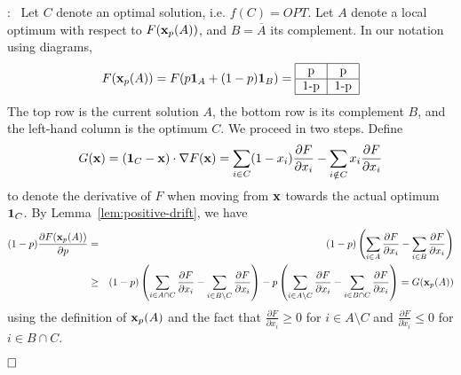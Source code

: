 \documentclass{article}[11pt]
\newcommand{\partdiff}[2]{\frac{\partial {#1}}{\partial {#2}}}
\renewenvironment{proof}{\noindent{\bf Proof}:~}{$\hfill \Box$\\}
\newcommand{\T}[4] {\begin{tabular}{|c|c|}
\hline
#1 & #2 \\
\hline
#3 & #4 \\
\hline
\end{tabular}}
\def\b1{{\bf 1}}
\def\bx{{\bf x}}
\begin{document}
\begin{proof}
Let $C$ denote an optimal solution, i.e. $f(C) = OPT$.
Let $A$ denote a local optimum with respect to $F(\bx_p(A))$, and $B = \overline{A}$ its complement.
In our notation using diagrams,
$$ F(\bx_p(A)) = F(p \b1_A + (1-p) \b1_B) = \T{p}{p}{1-p}{1-p} $$
The top row is the current solution $A$, the bottom row is its complement $B$,
and the left-hand column is the optimum $C$.
We proceed in two steps. Define 
$$ G(\bx) = (\b1_C - \bx) \cdot \nabla F(\bx) = \sum_{i \in C} (1-x_i) \partdiff{F}{x_i}
 - \sum_{i \notin C} x_i \partdiff{F}{x_i} $$
to denote the derivative of $F$ when moving from $\bx$ towards the actual optimum $\b1_C$.
By Lemma~\ref{lem:positive-drift}, we have
\begin{eqnarray*}
 (1-p) \partdiff{F(\bx_p(A))}{p} & = &
 (1-p) \left( \sum_{i \in A} \partdiff{F}{x_i} - \sum_{i \in B} \partdiff{F}{x_i} \right) \\
  & \geq & (1-p) \left( \sum_{i \in A \cap C} \partdiff{F}{x_i} - \sum_{i \in B \setminus C}
 \partdiff{F}{x_i} \right) - p \left( \sum_{i \in A \setminus C} \partdiff{F}{x_i}
- \sum_{i \in B \cap C}  \partdiff{F}{x_i} \right) = G(\bx_p(A))
\end{eqnarray*}
using the definition of $\bx_p(A)$ and the fact that
$\partdiff{F}{x_i} \geq 0$ for $i \in A \setminus C$ and
$\partdiff{F}{x_i} \leq 0$ for $i \in B \cap C$.



\end{proof}
\end{document}
